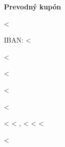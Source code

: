 \documentclass{scrartcl}
\begin{document}
\fontsize{9pt}{10pt}\selectfont

\vspace*{1cm}

\textbf{Prevodný kupón}

\hfill <%

IBAN: <%

<%

\vspace{0.3cm}

<%

<%

<%

<%
<%
\hspace{-1mm}, <%
<%
<%

<%
\end{document}
